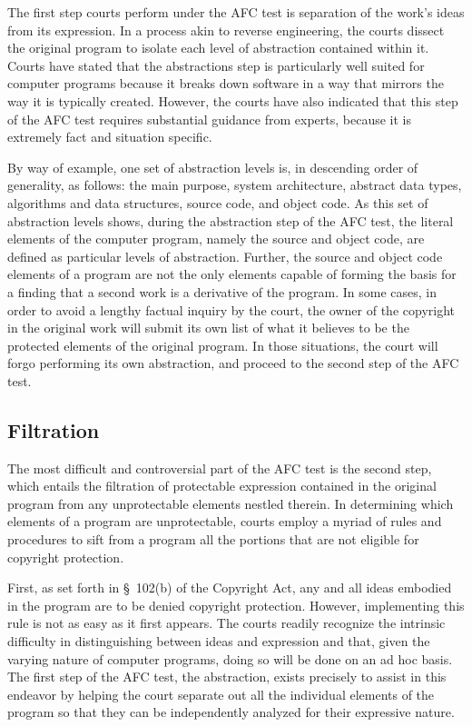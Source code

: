 The first step courts perform under the AFC test is separation of the
work's ideas from its expression. In a process akin to reverse
engineering, the courts dissect the original program to isolate each level
of abstraction contained within it. Courts have stated that the
abstractions step is particularly well suited for computer programs
because it breaks down software in a way that mirrors the way it is
typically created. However, the courts have also indicated that this step
of the AFC test requires substantial guidance from experts, because it is
extremely fact and situation specific.

By way of example, one set of abstraction levels is, in descending order
of generality, as follows: the main purpose, system architecture, abstract
data types, algorithms and data structures, source code, and object
code. As this set of abstraction levels shows, during the abstraction step
of the AFC test, the literal elements of the computer program, namely the
source and object code, are defined as particular levels of
abstraction. Further, the source and object code elements of a program are
not the only elements capable of forming the basis for a finding that a
second work is a derivative of the program. In some cases, in order to
avoid a lengthy factual inquiry by the court, the owner of the copyright in
the original work will submit its own list of what it believes to be the
protected elements of the original program. In those situations, the court
will forgo performing its own abstraction, and proceed to the second step of
the AFC test.

\subsection{Filtration}

The most difficult and controversial part of the AFC test is the second
step, which entails the filtration of protectable expression contained in
the original program from any unprotectable elements nestled therein. In
determining which elements of a program are unprotectable, courts employ a
myriad of rules and procedures to sift from a program all the portions
that are not eligible for copyright protection.

First, as set forth in \S~102(b) of the Copyright Act, any and all ideas
embodied in the program are to be denied copyright protection. However,
implementing this rule is not as easy as it first appears. The courts
readily recognize the intrinsic difficulty in distinguishing between ideas
and expression and that, given the varying nature of computer programs,
doing so will be done on an ad hoc basis. The first step of the AFC test,
the abstraction, exists precisely to assist in this endeavor by helping
the court separate out all the individual elements of the program so that
they can be independently analyzed for their expressive nature.

